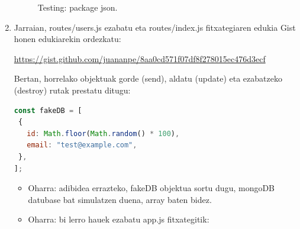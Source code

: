 \begin{enumerate}
\begin{figure}[ht]
	\centering
{}
\caption{Testing: package json.}
\label{fig:testing-package-json}
\end{figure}


\item 
Jarraian, routes/users.js ezabatu eta routes/index.js fitxategiaren edukia Gist honen edukiarekin ordezkatu:

\href{https://gist.github.com/juananpe/8aa0cd571f07df8f278015ec476d3ecf}{https://gist.github.com/juananpe/8aa0cd571f07df8f278015ec476d3ecf}


Bertan, horrelako objektuak gorde (send), aldatu (update) eta ezabatzeko (destroy) rutak prestatu ditugu:

\begin{lstlisting}[language=JavaScript,numbers=none]
    const fakeDB = [
 {
   id: Math.floor(Math.random() * 100),
   email: "test@example.com",
 },
];
\end{lstlisting}

\begin{itemize}
    \item 

Oharra: adibidea errazteko, fakeDB objektua sortu dugu, mongoDB datubase bat simulatzen duena, array baten bidez.
\item 
Oharra: bi lerro hauek ezabatu app.js fitxategitik: 


\end{itemize}
\end{enumerate}
